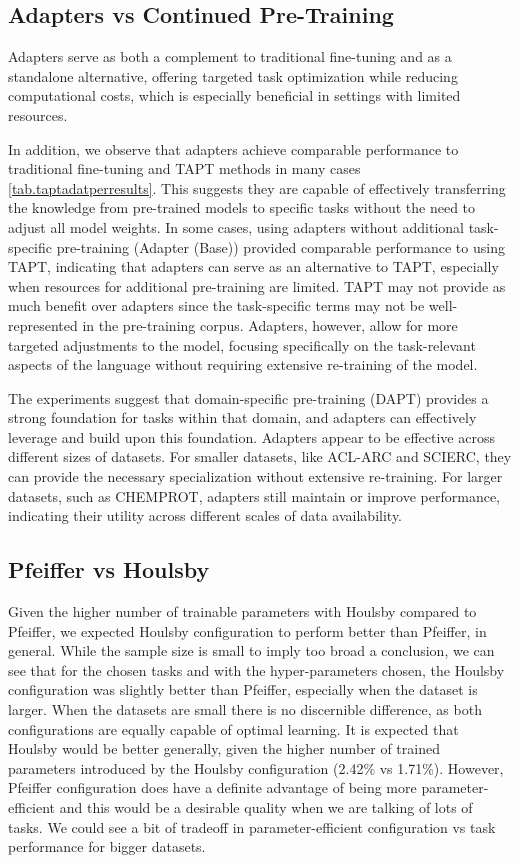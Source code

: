 \documentclass[10pt,twocolumn,letterpaper]{article}
\begin{document}
\subsection{Adapters vs Continued Pre-Training} Adapters serve as both a complement to traditional fine-tuning and as a standalone alternative, offering targeted task optimization while reducing computational costs, which is especially beneficial in settings with limited resources.

In addition, we observe that adapters achieve comparable performance to traditional fine-tuning and TAPT methods in many cases \ref{tab.taptadatperresults}. This suggests they are capable of effectively transferring the knowledge from pre-trained models to specific tasks without the need to adjust all model weights. In some cases, using adapters without additional task-specific pre-training (Adapter (Base)) provided comparable performance to using TAPT, indicating that adapters can serve as an alternative to TAPT, especially when resources for additional pre-training are limited. TAPT may not provide as much benefit over adapters since the task-specific terms may not be well-represented in the pre-training corpus. Adapters, however, allow for more targeted adjustments to the model, focusing specifically on the task-relevant aspects of the language without requiring extensive re-training of the model.

The experiments suggest that domain-specific pre-training (DAPT) provides a strong foundation for tasks within that domain, and adapters can effectively leverage and build upon this foundation. Adapters appear to be effective across different sizes of datasets. For smaller datasets, like ACL-ARC and SCIERC, they can provide the necessary specialization without extensive re-training. For larger datasets, such as CHEMPROT, adapters still maintain or improve performance, indicating their utility across different scales of data availability.



\subsection{Pfeiffer vs Houlsby} Given the higher number of trainable parameters with Houlsby compared to Pfeiffer, we expected Houlsby configuration to perform better than Pfeiffer, in general. While the sample size is small to imply too broad a conclusion, we can see that for the chosen tasks and with the hyper-parameters chosen, the Houlsby configuration was slightly better than Pfeiffer, especially when the dataset is larger. When the datasets are small there is no discernible difference, as both configurations are equally capable of optimal learning. It is expected that Houlsby would be better generally, given the higher number of trained parameters introduced by the Houlsby configuration (2.42\% vs 1.71\%). However, Pfeiffer configuration does have a definite advantage of being more parameter-efficient and this would be a desirable quality when we are talking of lots of tasks. We could see a bit of tradeoff in parameter-efficient configuration vs task performance for bigger datasets.
\end{document}
